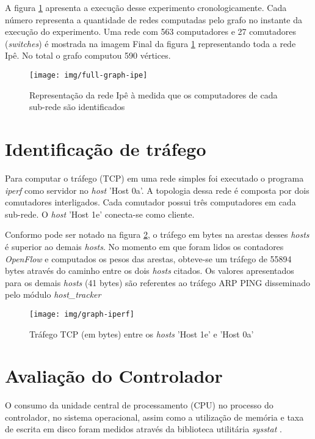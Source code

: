 A figura \ref{fig:full-graph-ipe} apresenta a execução desse experimento
cronologicamente.
Cada número representa a quantidade de redes computadas pelo grafo no instante
da execução do experimento.
Uma rede com 563 computadores e 27 comutadores (\emph{switches}) é mostrada
na imagem Final da figura \ref{fig:full-graph-ipe} representando toda a rede
Ipê.
No total o grafo computou 590 vértices.

\begin{figure}[htb!]
    \centering
    \label{fig:full-graph-ipe}
    \texttt{[image: img/full-graph-ipe]}
    \caption{Representação da rede Ipê à medida que os computadores de cada
    sub-rede são identificados}
\end{figure}


\section{Identificação de tráfego}

Para computar o tráfego (TCP) em uma rede simples foi executado o programa
\emph{iperf} como servidor no \emph{host} 'Host 0a'.
A topologia dessa rede é composta por dois comutadores interligados.
Cada comutador possui três computadores em cada sub-rede.
O \emph{host} 'Host 1e' conecta-se como cliente.

Conformo pode ser notado na figura \ref{fig:iperf}, o tráfego
em bytes na arestas desses \emph{hosts} é superior ao demais \emph{hosts}.
No momento em que foram lidos os contadores \emph{OpenFlow} e computados
os pesos das arestas, obteve-se um tráfego de 55894 bytes através do caminho
entre os dois \emph{hosts} citados.
Os valores apresentados para os demais \emph{hosts} (41 bytes) são referentes
ao tráfego ARP PING disseminado pelo módulo \emph{host\_tracker}

\begin{figure}[h!]
    \centering
    \texttt{[image: img/graph-iperf]}
    \caption{Tráfego TCP (em bytes) entre os \emph{hosts} ’Host 1e’ e
    ’Host 0a’}
    \label{fig:iperf}
\end{figure}

\section{Avaliação do Controlador}

O consumo da unidade central de processamento (CPU) no processo do controlador,
no sistema operacional, assim como a utilização de memória e taxa de escrita
em disco foram medidos através da biblioteca utilitária \emph{sysstat}
\citep{sebastien2015sysstat}.

